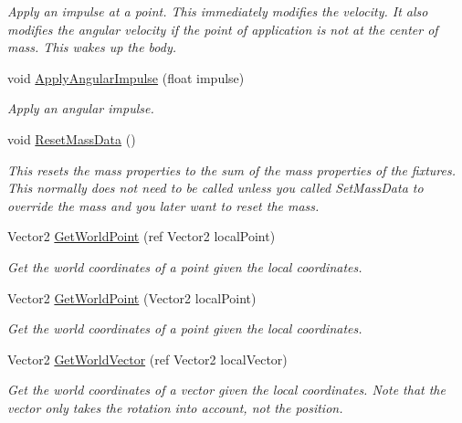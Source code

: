 \begin{DoxyCompactItemize}
\begin{DoxyCompactList}\small\item\em Apply an impulse at a point. This immediately modifies the velocity. It also modifies the angular velocity if the point of application is not at the center of mass. This wakes up the body. \end{DoxyCompactList}\item 
void \hyperlink{class_farseer_physics_1_1_dynamics_1_1_body_a411e2d14745f53b202219fdb03bb8dcb}{Apply\+Angular\+Impulse} (float impulse)
\begin{DoxyCompactList}\small\item\em Apply an angular impulse. \end{DoxyCompactList}\item 
void \hyperlink{class_farseer_physics_1_1_dynamics_1_1_body_aa0f2f90fc6114001f028408bcb9012d3}{Reset\+Mass\+Data} ()
\begin{DoxyCompactList}\small\item\em This resets the mass properties to the sum of the mass properties of the fixtures. This normally does not need to be called unless you called Set\+Mass\+Data to override the mass and you later want to reset the mass. \end{DoxyCompactList}\item 
Vector2 \hyperlink{class_farseer_physics_1_1_dynamics_1_1_body_aa78707878f7b06d5b58b471b33758e05}{Get\+World\+Point} (ref Vector2 local\+Point)
\begin{DoxyCompactList}\small\item\em Get the world coordinates of a point given the local coordinates. \end{DoxyCompactList}\item 
Vector2 \hyperlink{class_farseer_physics_1_1_dynamics_1_1_body_a1a94cc35bd0abcaab9acf643cc621a3d}{Get\+World\+Point} (Vector2 local\+Point)
\begin{DoxyCompactList}\small\item\em Get the world coordinates of a point given the local coordinates. \end{DoxyCompactList}\item 
Vector2 \hyperlink{class_farseer_physics_1_1_dynamics_1_1_body_a5539aa0b3f895c343e85c9603466375d}{Get\+World\+Vector} (ref Vector2 local\+Vector)
\begin{DoxyCompactList}\small\item\em Get the world coordinates of a vector given the local coordinates. Note that the vector only takes the rotation into account, not the position. \end{DoxyCompactList}\item 

\end{DoxyCompactItemize}

